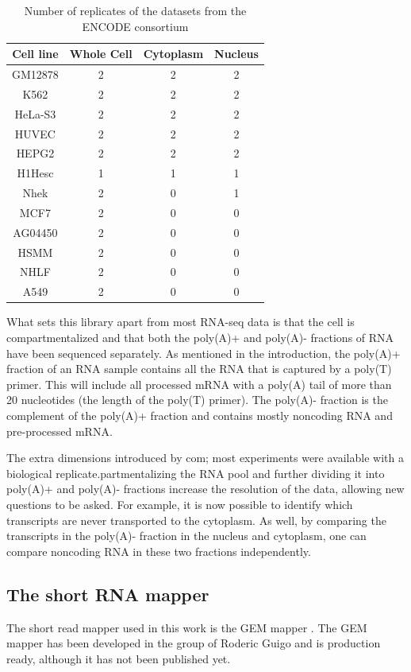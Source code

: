 \begin{table}[hb]
	\centering
	\begin{tabular}{cccc}
	  Cell line & Whole Cell & Cytoplasm & Nucleus \\
	  \midrule
	  GM12878 & 2 & 2 & 2 \\
	  K562 & 2 & 2 & 2 \\
	  HeLa-S3 & 2 & 2 & 2 \\
	  HUVEC & 2 & 2 & 2 \\
	  HEPG2 & 2 & 2 & 2 \\
	  H1Hesc & 1 & 1 & 1 \\
	  Nhek & 2 & 0 & 1 \\
	  MCF7 & 2 & 0 & 0 \\
	  AG04450 & 2 & 0 & 0 \\
	  HSMM & 2 & 0 & 0 \\
	  NHLF & 2 & 0 & 0 \\
	  A549 & 2 & 0 & 0 \\
	\end{tabular}
	\caption{Number of replicates of the datasets from the ENCODE consortium}
	\label{tab:Datasets}
\end{table}

What sets this library apart from most RNA-seq data is that the cell is
compartmentalized and that both the poly(A)+ and poly(A)- fractions of RNA have
been sequenced separately. As mentioned in the introduction, the poly(A)+
fraction of an RNA sample contains all the RNA that is captured by a poly(T)
primer. This will include all processed mRNA with a poly(A) tail of more than
20 nucleotides (the length of the poly(T) primer). The poly(A)- fraction is the
complement of the poly(A)+ fraction and contains mostly noncoding RNA and
pre-processed mRNA.

The extra dimensions introduced by com; most experiments were available with a
biological replicate.partmentalizing the RNA pool and further dividing it into
poly(A)+ and poly(A)- fractions increase the resolution of the data, allowing
new questions to be asked. For example, it is now possible to identify which
transcripts are never transported to the cytoplasm. As well, by comparing the
transcripts in the poly(A)- fraction in the nucleus and cytoplasm, one can
compare noncoding RNA in these two fractions independently. 

\subsection{The short RNA mapper}
The short read mapper used in this work is the GEM mapper
\cite{ribeca_gem_2010}. The GEM mapper has been developed in the group of
Roderic Guigo and is production ready, although it has not been published yet.

